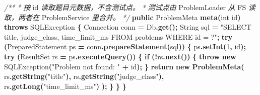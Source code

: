 \documentclass[
  11pt,
]{ctexart}
\newenvironment{Shaded}{\begin{snugshade}}{\end{snugshade}}
\newcommand{\BuiltInTok}[1]{#1}
\newcommand{\CommentTok}[1]{\textcolor[rgb]{0.56,0.35,0.01}{\textit{#1}}}
\newcommand{\ControlFlowTok}[1]{\textcolor[rgb]{0.13,0.29,0.53}{\textbf{#1}}}
\newcommand{\DataTypeTok}[1]{\textcolor[rgb]{0.13,0.29,0.53}{#1}}
\newcommand{\DecValTok}[1]{\textcolor[rgb]{0.00,0.00,0.81}{#1}}
\newcommand{\FunctionTok}[1]{\textcolor[rgb]{0.13,0.29,0.53}{\textbf{#1}}}
\newcommand{\KeywordTok}[1]{\textcolor[rgb]{0.13,0.29,0.53}{\textbf{#1}}}
\newcommand{\NormalTok}[1]{#1}
\newcommand{\OperatorTok}[1]{\textcolor[rgb]{0.81,0.36,0.00}{\textbf{#1}}}
\newcommand{\StringTok}[1]{\textcolor[rgb]{0.31,0.60,0.02}{#1}}
\begin{document}
\begin{Shaded}
\begin{Highlighting}[]
    \CommentTok{/**}
     \CommentTok{*} \CommentTok{按}\NormalTok{ id }\CommentTok{读取题目元数据，不含测试点。}
     \CommentTok{*} \CommentTok{测试点由}\NormalTok{ ProblemLoader }\CommentTok{从}\NormalTok{ FS }\CommentTok{读取，两者在}\NormalTok{ ProblemService }\CommentTok{里合并。}
     \CommentTok{*/}
    \KeywordTok{public}\NormalTok{ ProblemMeta }\FunctionTok{meta}\OperatorTok{(}\DataTypeTok{int}\NormalTok{ id}\OperatorTok{)} \KeywordTok{throws} \BuiltInTok{SQLException} \OperatorTok{\{}
        \BuiltInTok{Connection}\NormalTok{ conn }\OperatorTok{=}\NormalTok{ Db}\OperatorTok{.}\FunctionTok{get}\OperatorTok{();}
        \BuiltInTok{String}\NormalTok{ sql }\OperatorTok{=} \StringTok{"SELECT title, judge\_class, time\_limit\_ms FROM problems WHERE id = ?"}\OperatorTok{;}
        \ControlFlowTok{try} \OperatorTok{(}\BuiltInTok{PreparedStatement}\NormalTok{ ps }\OperatorTok{=}\NormalTok{ conn}\OperatorTok{.}\FunctionTok{prepareStatement}\OperatorTok{(}\NormalTok{sql}\OperatorTok{))} \OperatorTok{\{}
\NormalTok{            ps}\OperatorTok{.}\FunctionTok{setInt}\OperatorTok{(}\DecValTok{1}\OperatorTok{,}\NormalTok{ id}\OperatorTok{);}
            \ControlFlowTok{try} \OperatorTok{(}\BuiltInTok{ResultSet}\NormalTok{ rs }\OperatorTok{=}\NormalTok{ ps}\OperatorTok{.}\FunctionTok{executeQuery}\OperatorTok{())} \OperatorTok{\{}
                \ControlFlowTok{if} \OperatorTok{(!}\NormalTok{rs}\OperatorTok{.}\FunctionTok{next}\OperatorTok{())} \OperatorTok{\{}
                    \ControlFlowTok{throw} \KeywordTok{new} \BuiltInTok{SQLException}\OperatorTok{(}\StringTok{"Problem not found: "} \OperatorTok{+}\NormalTok{ id}\OperatorTok{);}
                \OperatorTok{\}}
                \ControlFlowTok{return} \KeywordTok{new} \FunctionTok{ProblemMeta}\OperatorTok{(}
\NormalTok{                    rs}\OperatorTok{.}\FunctionTok{getString}\OperatorTok{(}\StringTok{"title"}\OperatorTok{),}
\NormalTok{                    rs}\OperatorTok{.}\FunctionTok{getString}\OperatorTok{(}\StringTok{"judge\_class"}\OperatorTok{),}
\NormalTok{                    rs}\OperatorTok{.}\FunctionTok{getLong}\OperatorTok{(}\StringTok{"time\_limit\_ms"}\OperatorTok{)}
                \OperatorTok{);}
            \OperatorTok{\}}
        \OperatorTok{\}}
    \OperatorTok{\}}


\end{Highlighting}
\end{Shaded}
\end{document}
